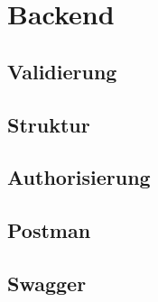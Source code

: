 \chapter{Backend}\label{ch:backend}

\section{Validierung}

\section{Struktur}

\section{Authorisierung}

\section{Postman}

\section{Swagger}



